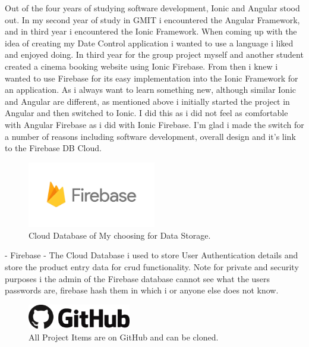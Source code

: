 Out of the four years of studying software development, Ionic and Angular stood out. In my second year of study in GMIT i encountered the Angular Framework, and in third year i encountered the Ionic Framework. When coming up with the idea of creating my Date Control application i wanted to use a language i liked and enjoyed doing. In third year for the group project myself and another student created a cinema booking website using Ionic Firebase. From then i knew i wanted to use Firebase for its easy implementation into the Ionic Framework for an application. As i always want to learn something new, although similar Ionic and Angular are different, as mentioned above i initially started the project in Angular and then switched to Ionic. I did this as i did not feel as comfortable with Angular Firebase as i did with Ionic Firebase. I'm glad i made the switch for a number of reasons including software development, overall design and it's link to the Firebase DB Cloud.
\newline

\begin{figure}[h!]
	\caption{Cloud Database of My choosing for Data Storage.}
	\label{image:fire-base}
	\centering
	\includegraphics[width=0.5\textwidth]{images/fire-base.png}
\end{figure}

- Firebase - The Cloud Database i used to store User Authentication details and store the product entry data for crud functionality. Note for private and security purposes i the admin of the Firebase database cannot see what the users passwords are, firebase hash them in which i or anyone else does not know.
\newline

\begin{figure}[h!]
	\caption{All Project Items are on GitHub and can be cloned.}
	\label{image:github1}
	\centering
	\includegraphics[width=0.4\textwidth]{images/github.png}
\end{figure}

